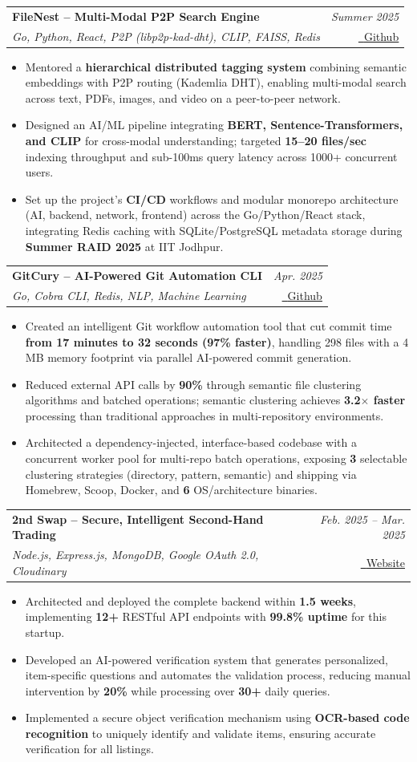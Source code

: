 \documentclass[letterpaper,10pt]{article}
\makeatletter
\newcommand{\resumeItem}[1]{
  \item\small{
    {#1 \vspace{-1mm}}
  }
}
\newcommand{\resumeProject}[4]{
  \item
    \begin{tabular*}{0.97\textwidth}[t]{l@{\extracolsep{\fill}}r}
      \textbf{\small #1} & \textit{\small #3} \\
      \textit{\small #2} & \small #4 \\
    \end{tabular*}\vspace{-7pt}
}
\newcommand{\resumeItemListStart}{\begin{itemize}}
\newcommand{\resumeItemListEnd}{\end{itemize}\vspace{-5pt}}
\makeatother
\begin{document}
      \resumeProject
        {FileNest -- Multi-Modal P2P Search Engine}
        {Go, Python, React, P2P (libp2p-kad-dht), CLIP, FAISS, Redis}
        {Summer 2025}
        {\href{https://github.com/AISocietyIITJ/FileNest}{\faGithub \ \underline{Github}}}
        \resumeItemListStart
          \resumeItem{Mentored a \textbf{hierarchical distributed tagging system} combining semantic embeddings with P2P routing (Kademlia DHT), enabling multi-modal search across text, PDFs, images, and video on a peer-to-peer network.}
          \resumeItem{Designed an AI/ML pipeline integrating \textbf{BERT, Sentence-Transformers, and CLIP} for cross-modal understanding; targeted \textbf{15--20 files/sec} indexing throughput and sub-100ms query latency across 1000+ concurrent users.}
          \resumeItem{Set up the project's \textbf{CI/CD} workflows and modular monorepo architecture (AI, backend, network, frontend) across the Go/Python/React stack, integrating Redis caching with SQLite/PostgreSQL metadata storage during \textbf{Summer RAID 2025} at IIT Jodhpur.}
        \resumeItemListEnd

      \resumeProject
        {GitCury -- AI-Powered Git Automation CLI}
        {Go, Cobra CLI, Redis, NLP, Machine Learning}
        {Apr. 2025}
        {\href{https://github.com/lakshyajain-0291/GitCury}{\faGithub \ \underline{Github}}}
        \resumeItemListStart
          \resumeItem{Created an intelligent Git workflow automation tool that cut commit time \textbf{from 17 minutes to 32 seconds (97\% faster)}, handling 298 files with a 4 MB memory footprint via parallel AI-powered commit generation.}
          \resumeItem{Reduced external API calls by \textbf{90\%} through semantic file clustering algorithms and batched operations; semantic clustering achieves \textbf{3.2$\times$ faster} processing than traditional approaches in multi-repository environments.}
          \resumeItem{Architected a dependency-injected, interface-based codebase with a concurrent worker pool for multi-repo batch operations, exposing \textbf{3} selectable clustering strategies (directory, pattern, semantic) and shipping via Homebrew, Scoop, Docker, and \textbf{6} OS/architecture binaries.}
        \resumeItemListEnd

      \resumeProject
        {2nd Swap -- Secure, Intelligent Second-Hand Trading}
        {Node.js, Express.js, MongoDB, Google OAuth 2.0, Cloudinary}
        {Feb. 2025 -- Mar. 2025}
        {\href{https://www.2ndswap.in/}{\faGlobe \ \underline{Website}}}
        \resumeItemListStart
          \resumeItem{Architected and deployed the complete backend within \textbf{1.5 weeks}, implementing \textbf{12+} RESTful API endpoints with \textbf{99.8\% uptime} for this startup.}
          \resumeItem{Developed an AI-powered verification system that generates personalized, item-specific questions and automates the validation process, reducing manual intervention by \textbf{20\%} while processing over \textbf{30+} daily queries.}
          \resumeItem{Implemented a secure object verification mechanism using \textbf{OCR-based code recognition} to uniquely identify and validate items, ensuring accurate verification for all listings.}
        \resumeItemListEnd
\end{document}
